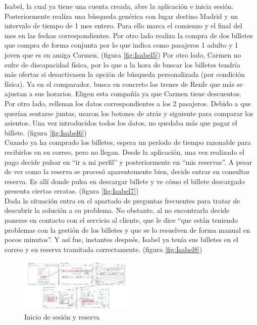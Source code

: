 Isabel, la cual ya tiene una cuenta creada, abre la aplicación e inicia sesión. Posteriormente realiza una búsqueda genérica con lugar destino Madrid y un intervalo de tiempo de 1 mes entero. Para ello marca el comienzo y el final del mes en las fechas correspondientes. Por otro lado realiza la compra de dos billetes que compra de forma conjunta por lo que indica como pasajeros 1 adulto y 1 joven que es su amiga Carmen. (figura \ref{fig:Isabel5})
Por otro lado, Carmen no sufre de discapacidad física, por lo que a la hora de buscar los billetes tendría más ofertas si desactivasen la opción de búsqueda personalizada (por condición física).
Ya en el comparador, busca en concreto los trenes de Renfe que más se ajustan a sus horarios. Eligen esta compañía ya que Carmen tiene descuentos. Por otro lado, rellenan los datos correspondientes a los 2 pasajeros. Debido a que querían sentarse juntas, usaron los botones de atrás y siguiente para comparar los asientos. 
Una vez introducidos todos los datos, no quedaba más que pagar el billete. (figura \ref{fig:Isabel6}) \\

Cuando ya ha comprado los billetes, espera un período de tiempo razonable para recibirlos en su correo, pero no llegan. Desde la aplicación, una vez realizado el 
pago decide pulsar en “ir a mi perfil” y posteriormente en “mis reservas”. A pesar de ver como la reserva se procesó aparentemente bien, decide entrar en consultar 
reserva. Es allí donde pulsa en descargar billete y ve cómo el billete descargado presenta ciertas erratas. (figura \ref{fig:Isabel7}) \\


Dada la situación entra en el apartado de preguntas frecuentes para tratar de descubrir la solución a su problema. No obstante, al no encontrarla decide ponerse en 
contacto con el servicio al cliente, que le dice “que están teniendo problemas con la gestión de los billetes y que se lo resuelven de forma manual en pocos minutos”. 
Y así fue, instantes después, Isabel ya tenía sus billetes en el correo y su reserva tramitada correctamente. (figura \ref{fig:Isabel8})
\begin{figure}[H]
    \centering
    \includegraphics[width=0.5\textwidth]{Imagenes/Keypath/Marta1.png}
    \caption{Inicio de sesión y reserva}
    \label{fig:Marta1}
\end{figure}

